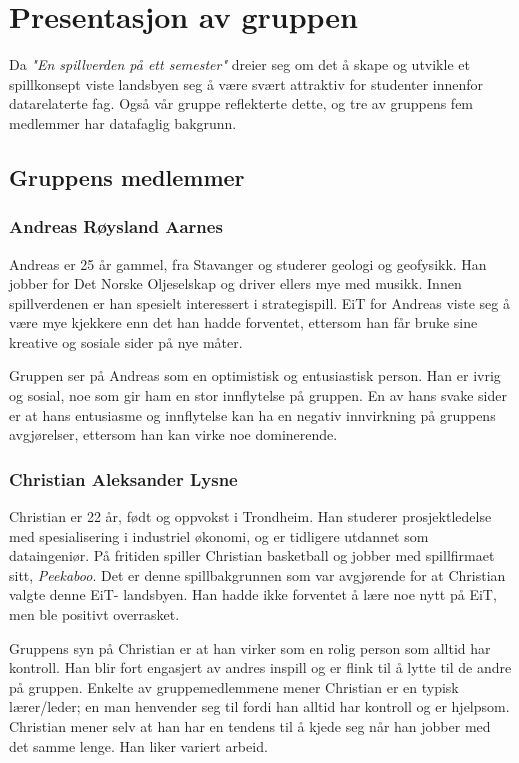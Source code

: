 \section{Presentasjon av gruppen}
Da \emph{"En spillverden på ett semester"} dreier seg om det å skape og utvikle et spillkonsept viste landsbyen seg å være svært attraktiv for studenter innenfor datarelaterte fag. Også vår gruppe reflekterte dette, og tre av gruppens fem medlemmer har datafaglig bakgrunn.

\subsection{Gruppens medlemmer}
	\subsubsection{Andreas Røysland Aarnes}
	Andreas er 25 år gammel, fra Stavanger og studerer geologi og geofysikk. Han jobber for Det Norske Oljeselskap og driver ellers mye med musikk. Innen spillverdenen er han spesielt interessert i strategispill. EiT for Andreas viste seg å være mye kjekkere enn det han hadde forventet, ettersom han får bruke sine kreative og sosiale sider på nye måter. 

	Gruppen ser på Andreas som en optimistisk og entusiastisk person. Han er ivrig og sosial, noe som gir ham en stor innflytelse på gruppen. En av hans svake sider er at hans entusiasme og innflytelse kan ha en negativ innvirkning på gruppens avgjørelser, ettersom han kan virke noe dominerende.

	\subsubsection{Christian Aleksander Lysne}
	Christian er 22 år, født og oppvokst i Trondheim. Han studerer prosjektledelse med spesialisering i industriel økonomi, og er tidligere utdannet som dataingeniør. På fritiden spiller Christian basketball og jobber med spillfirmaet sitt, \emph{Peekaboo}. Det er denne spillbakgrunnen som var avgjørende for at Christian valgte denne EiT- landsbyen. Han hadde ikke forventet å lære noe nytt på EiT, men ble positivt overrasket.   

	Gruppens syn på Christian er at han virker som en rolig person som alltid har kontroll. Han blir fort engasjert av andres inspill og er flink til å lytte til de andre på gruppen. Enkelte av gruppemedlemmene mener Christian er en typisk lærer/leder; en man henvender seg til fordi han alltid har kontroll og er hjelpsom. Christian mener selv at han har en tendens til å kjede seg når han jobber med det samme lenge. Han liker variert arbeid.

